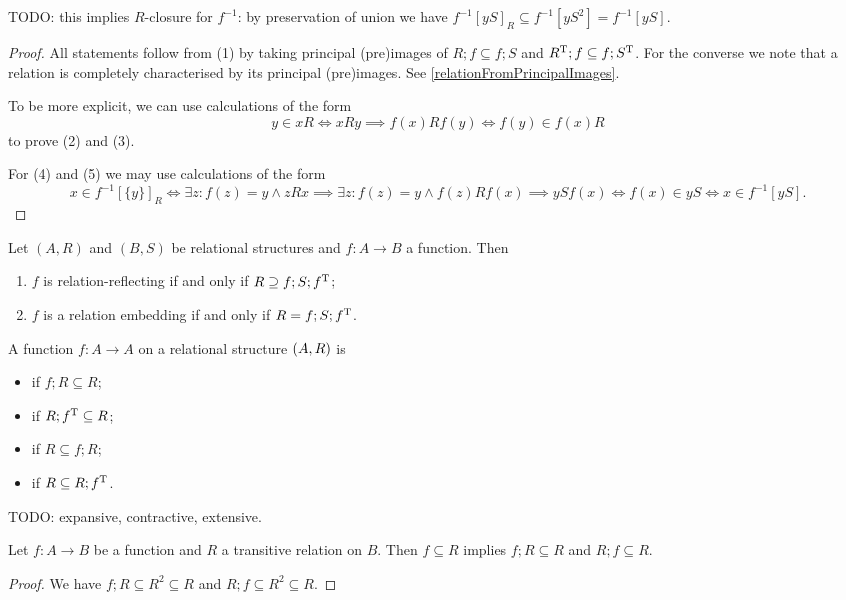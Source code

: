 TODO: this implies $R$-closure for $f^{-1}$: by preservation of union we have $f^{-1}[yS]_R \subseteq f^{-1}[yS^2] = f^{-1}[yS]$.
\begin{proof}
All statements follow from (1) by taking principal (pre)images of $R;f \subseteq f;S$ and $R^{\mathrm{T}};f \subseteq f;S^{\mathrm{T}}$. For the converse we note that a relation is completely characterised by its principal (pre)images. See \ref{relationFromPrincipalImages}.

To be more explicit, we can use calculations of the form
\[ y\in xR \iff xRy \implies f(x)Rf(y) \iff f(y) \in f(x)R \]
to prove (2) and (3).

For (4) and (5) we may use calculations of the form
\[ x\in f^{-1}[\{y\}]_R \iff \exists z: f(z) = y \land zRx \implies \exists z: f(z) = y \land f(z)Rf(x) \implies ySf(x) \iff f(x) \in yS \iff x\in f^{-1}[yS]. \]
\end{proof}

\begin{lemma}
Let $(A, R)$ and $(B, S)$ be relational structures and $f: A\to B$ a function. Then
\begin{enumerate}
\item $f$ is relation-reflecting \textup{if and only if} $R \supseteq f;S;f^{\mathrm{T}}$;
\item $f$ is a relation embedding \textup{if and only if} $R = f;S;f^{\mathrm{T}}$.
\end{enumerate}
\end{lemma}

\begin{definition}
A function $f: A\to A$ on a relational structure $\left( A, R \right)$ is
\begin{itemize}
\item {} if $f;R \subseteq R$;
\item {} if $R;f^{\mathrm{T}} \subseteq R$;
\item {} if $R \subseteq f;R$;
\item {} if $R \subseteq R;f^{\mathrm{T}}$.
\end{itemize}
\end{definition}

TODO: expansive, contractive, extensive.

\begin{lemma} \label{transitiveRestrictiveLemma}
Let $f: A\to B$ be a function and $R$ a transitive relation on $B$. Then $f\subseteq R$ implies $f;R\subseteq R$ and $R;f\subseteq R$.
\end{lemma}
\begin{proof}
We have $f;R\subseteq R^2 \subseteq R$ and $R;f \subseteq R^2 \subseteq R$.
\end{proof}

